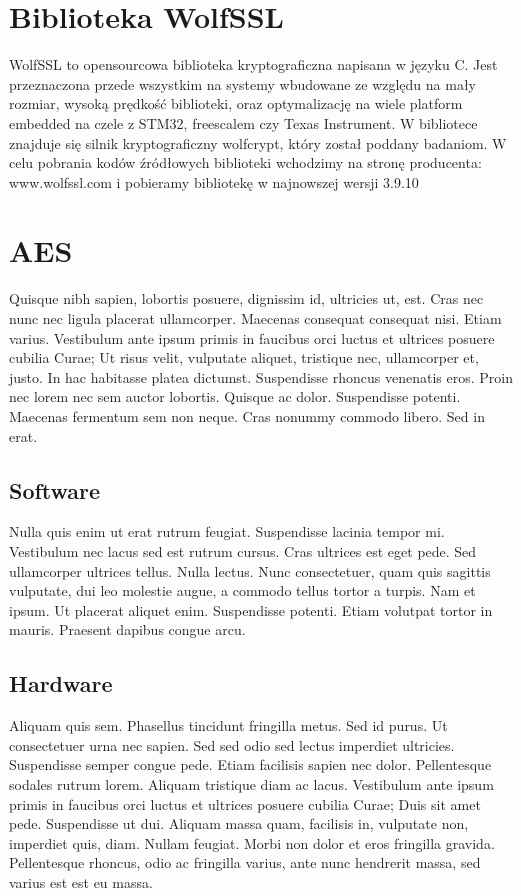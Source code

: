 \documentclass[oneside]{mgr}
\begin{document}
\chapter{Biblioteka WolfSSL}
WolfSSL to opensourcowa biblioteka kryptograficzna napisana w języku C. Jest przeznaczona przede wszystkim na systemy wbudowane ze względu na mały rozmiar, wysoką prędkość biblioteki, oraz optymalizację na wiele platform embedded na czele z STM32, freescalem czy Texas Instrument. W bibliotece znajduje się silnik kryptograficzny wolfcrypt, który został poddany badaniom. W celu pobrania kodów źródłowych biblioteki wchodzimy na stronę producenta: www.wolfssl.com i pobieramy bibliotekę w najnowszej wersji 3.9.10

\chapter{AES}
Quisque nibh sapien, lobortis posuere, dignissim id, ultricies ut,
est. Cras nec nunc nec ligula placerat ullamcorper. Maecenas consequat
consequat nisi. Etiam varius. Vestibulum ante ipsum primis in faucibus
orci luctus et ultrices posuere cubilia Curae; Ut risus velit,
vulputate aliquet, tristique nec, ullamcorper et, justo. In hac
habitasse platea dictumst. Suspendisse rhoncus venenatis eros. Proin
nec lorem nec sem auctor lobortis. Quisque ac dolor. Suspendisse
potenti. Maecenas fermentum sem non neque. Cras nonummy commodo
libero. Sed in erat.


\section{Software}
Nulla quis enim ut erat rutrum feugiat. Suspendisse lacinia tempor
mi. Vestibulum nec lacus sed est rutrum cursus. Cras ultrices est eget
pede. Sed ullamcorper ultrices tellus. Nulla lectus. Nunc
consectetuer, quam quis sagittis vulputate, dui leo molestie augue, a
commodo tellus tortor a turpis. Nam et ipsum. Ut placerat aliquet
enim. Suspendisse potenti. Etiam volutpat tortor in mauris. Praesent
dapibus congue arcu.

\section{Hardware}
Aliquam quis sem. Phasellus tincidunt fringilla metus. Sed id
purus. Ut consectetuer urna nec sapien. Sed sed odio sed lectus
imperdiet ultricies. Suspendisse semper congue pede. Etiam facilisis
sapien nec dolor. Pellentesque sodales rutrum lorem. Aliquam tristique
diam ac lacus. Vestibulum ante ipsum primis in faucibus orci luctus et
ultrices posuere cubilia Curae; Duis sit amet pede. Suspendisse ut
dui. Aliquam massa quam, facilisis in, vulputate non, imperdiet quis,
diam. Nullam feugiat. Morbi non dolor et eros fringilla
gravida. Pellentesque rhoncus, odio ac fringilla varius, ante nunc
hendrerit massa, sed varius est est eu massa.
\end{document}
